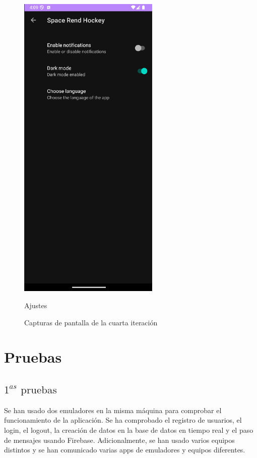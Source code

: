 \documentclass[a4paper,openright,12pt]{article}
\begin{document}
\begin{figure}[htp]
\begin{minipage}{0.3\textwidth}
        \includegraphics[width=0.6\textwidth]{Images/Vista_It4_8.png} 
        \caption{Ajustes}
        \label{fig:ajustes}
    \end{minipage}
    \caption{Capturas de pantalla de la cuarta iteración}
\end{figure}

\section{Pruebas}
\subsection{$1^{as} \text{ pruebas}$}
Se han usado dos emuladores en la misma máquina para comprobar el funcionamiento de la aplicación. Se ha comprobado el registro de usuarios, el login, el logout, la creación de datos en la base de datos en tiempo real y el paso de mensajes usando Firebase. Adicionalmente, se han usado varios equipos distintos y se han comunicado varias apps de emuladores y equipos diferentes.
\end{document}
